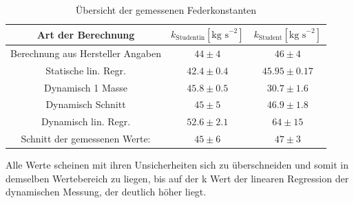 \documentclass[bibliography=totocnumbered]{scrartcl}
\begin{document}
	\begin{table}[ht!]
		\centering
		\caption{Übersicht der gemessenen Federkonstanten}
		\begin{tabular}{|c|c|c|}
			\hline
			Art der Berechnung & $ k_{\text{Studentin}} [\text{kg s}^{-2}] $  & $ k_{\text{Student}} [\text{kg s}^{-2}] $  \\
			\hline
			Berechnung aus Hersteller Angaben & $ 44\pm4 $ & $46\pm4 $ \\
			\hline
			Statische lin. Regr. & $ 42.4\pm0.4 $ & $45.95\pm0.17   $ \\
			\hline
			Dynamisch 1 Masse & $ 45.8\pm0.5 $ & $ 30.7\pm1.6 $ \\
			\hline
			Dynamisch Schnitt & $ 45\pm5 $ &$ 46.9\pm 1.8 $  \\
			\hline
			Dynamisch lin. Regr. & $ 52.6 \pm2.1$ & $ 64\pm15 $ \\
			\hline
			Schnitt der gemessenen Werte: & $  45\pm6$ &$ 47\pm 3 $  \\
			\hline
		\end{tabular}
		\label{tab: Übersicht}
	\end{table}
	
	Alle Werte scheinen mit ihren Unsicherheiten sich zu überschneiden und somit in demselben Wertebereich zu
	liegen, bis auf der k Wert der linearen Regression der dynamischen Messung, der deutlich höher liegt.
	\newpage
\end{document}
